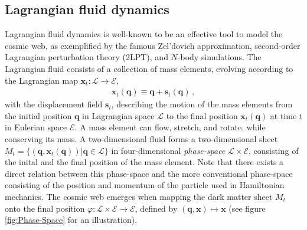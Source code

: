 \documentclass[a4paper, 11pt]{article}
\begin{document}
\subsection{Lagrangian fluid dynamics}
Lagrangian fluid dynamics is well-known to be an effective tool to model the cosmic web, as exemplified by the famous Zel'dovich approximation, second-order Lagrangian perturbation theory ($2$LPT), and $N$-body simulations. The Lagrangian fluid consists of a collection of mass elements, evolving according to the Lagrangian map $\bm{x}_t:\mathcal{L}\to \mathcal{E}$,
\begin{align}
\bm{x}_t(\bm{q}) \equiv \bm{q} + \bm{s}_t(\bm{q})\,,
\end{align}
with the displacement field $\bm{s}_t$, describing the motion of the mass elements from the initial position $\bm{q}$ in Lagrangian space $\mathcal{L}$ to the final position $\bm{x}_t(\bm{q})$ at time $t$ in Eulerian space $\mathcal{E}$. A mass element can flow, stretch, and rotate, while conserving its mass. A two-dimensional fluid forms a two-dimensional sheet $M_t=\{(\bm{q},\bm{x}_t(\bm{q})) | \bm{q}\in \mathcal{L}\}$ in four-dimensional \textit{phase-space} $\mathcal{L}\times \mathcal{E}$, consisting of the inital and the final position of the mass element. Note that there exists a direct relation between this phase-space and the more conventional phase-space consisting of the position and momentum of the particle used in Hamiltonian mechanics. The cosmic web emerges when mapping the dark matter sheet $M_t$ onto the final position $\varphi:\mathcal{L}\times \mathcal{E} \to \mathcal{E}$, defined by $(\bm{q},\bm{x}) \mapsto\bm{x}$ (see figure \ref{fig:Phase-Space} for an illustration).
\end{document}
